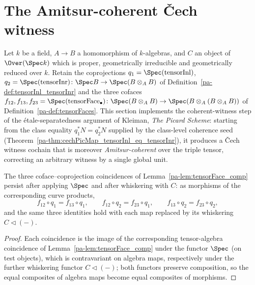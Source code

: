 \section{The Amitsur-coherent \v Cech witness}
\label{pa-sec:coherentWitness}

Let \(k\) be a field, \(A \to B\) a homomorphism of \(k\)-algebras, and \(C\) an object of
\(\Over(\Spec k)\) which is proper, geometrically irreducible and geometrically reduced over
\(k\). Retain the coprojections \(q_1 = \Spec(\mathrm{tensorInl})\),
\(q_2 = \Spec(\mathrm{tensorInr}) \colon \Spec B \to \Spec(B \otimes_A B)\) of
Definition~\ref{pa-def:tensorInl_tensorInr} and the three cofaces
\(f_{12}, f_{13}, f_{23} = \Spec(\mathrm{tensorFace}_{\bullet}) \colon \Spec(B \otimes_A B) \to
\Spec(B \otimes_A (B \otimes_A B))\) of Definition~\ref{pa-def:tensorFaces}. This section
implements the coherent-witness step of the \'etale-separatedness argument of Kleiman,
\emph{The Picard Scheme}: starting from the class equality \(q_1^{*} N = q_2^{*} N\) supplied by
the class-level coherence seed (Theorem~\ref{pa-thm:cechPicMap_tensorInl_eq_tensorInr}), it
produces a \v Cech witness cochain that is moreover \emph{Amitsur-coherent} over the triple
tensor, correcting an arbitrary witness by a single global unit.

\begin{lemma}
  \label{pa-lem:overSpec_whisker_face}
  \leanok

  The three coface--coprojection coincidences of Lemma~\ref{pa-lem:tensorFace_comp} persist after
  applying \(\Spec\) and after whiskering with \(C\): as morphisms of the corresponding
  curve products,
  \[
    f_{12} \circ q_1 = f_{13} \circ q_1, \qquad
    f_{12} \circ q_2 = f_{23} \circ q_1, \qquad
    f_{13} \circ q_2 = f_{23} \circ q_2,
  \]
  and the same three identities hold with each map replaced by its whiskering \(C \lhd (-)\).
\end{lemma}
\begin{proof}
  \leanok
  Each coincidence is the image of the corresponding tensor-algebra coincidence of
  Lemma~\ref{pa-lem:tensorFace_comp} under the functor \(\Spec\) (on test objects), which is
  contravariant on algebra maps, respectively under the further whiskering functor
  \(C \lhd (-)\); both functors preserve composition, so the equal composites of algebra maps
  become equal composites of morphisms.
\end{proof}

